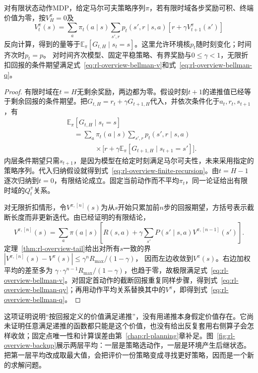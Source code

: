 \begin{theorem}[回报期望与递推一致]
  \label{thm:rl-overview-recursion}
  对有限状态动作MDP，给定马尔可夫策略序列$\pi$，若有限时域各步奖励可积、终端价值为零，按$V_H^\pi=0$及
  \begin{equation}
    V_t^\pi(s)=\sum_a\pi_t(a\mid s)\sum_{s',r}
      p_t(s',r\mid s,a)[r+\gamma V_{t+1}^\pi(s')]
    \label{eq:rl-overview-finite-recursion}
  \end{equation}
  反向计算，得到的量等于$\mathbb E_\pi[G_{t,H}\mid s_t=s]$。这里允许环境核$p_t$随时刻变化；时间齐次时$p_t=p$。
  对时间齐次模型、固定平稳策略、有界奖励与$0\leq\gamma<1$，无限折扣回报的条件期望满足式~\eqref{eq:rl-overview-bellman-v}和式~\eqref{eq:rl-overview-bellman-q}。
\end{theorem}

\begin{proof}
  有限时域在$t=H$无剩余奖励，两边都为零。假设时刻$t+1$的递推值已经等于剩余回报的条件期望。把$G_{t,H}=r_t+\gamma G_{t+1,H}$代入，并依次条件化于$a_t,r_t,s_{t+1}$，有
  \[
  \begin{aligned}
   &\mathbb E_\pi[G_{t,H}\mid s_t=s]\\
   &\quad=\sum_a\pi_t(a\mid s)\sum_{s',r}p_t(s',r\mid s,a)\\
   &\qquad\qquad{}\times
      \bigl[r+\gamma\mathbb E_\pi[G_{t+1,H}\mid s_{t+1}=s']\bigr].
  \end{aligned}
  \]
  内层条件期望只需$s_{t+1}$，是因为模型在给定时刻满足马尔可夫性，未来采用指定的策略序列。代入归纳假设就得到式~\eqref{eq:rl-overview-finite-recursion}。由$t=H-1$逐次归纳到$t=0$，有限结论成立。固定当前动作而不平均$\pi_t$，同一论证给出有限时域的$Q_t^\pi$关系。

  对无限折扣情形，令$V^{\pi,[n]}(s)$为从$s$开始只累加前$n$步的回报期望，方括号表示截断长度而非更新迭代。由已经证明的有限结论，
  \[
    V^{\pi,[n]}(s)=\sum_a\pi(a\mid s)
       \left[R(s,a)+\gamma\sum_{s'}P(s'\mid s,a)
                                       V^{\pi,[n-1]}(s')\right].
  \]
  定理~\ref{thm:rl-overview-tail}给出对所有$s$一致的界
  $|V^{\pi,[n]}(s)-V^\pi(s)|\leq\gamma^nR_{\max}/(1-\gamma)$，
  因而左边收敛到$V^\pi(s)$。右边加权平均的差至多为
  $\gamma\cdot\gamma^{n-1}R_{\max}/(1-\gamma)$，也趋于零，故极限满足式~\eqref{eq:rl-overview-bellman-v}。对固定首动作的截断回报重复同样步骤，得到式~\eqref{eq:rl-overview-bellman-qv}；再用动作平均关系替换其中的$V^\pi$，即得到式~\eqref{eq:rl-overview-bellman-q}。
\end{proof}

这项证明说明“按回报定义的价值满足递推”，没有用递推本身假定价值存在。它尚未证明任意满足递推的函数都只能是这个价值，也没有给出反复套用右侧算子会怎样收敛；固定点唯一性和计算误差由第~\ref{chap:rl-planning}章补足。图~\ref{fig:rl-overview-backup}展示两层平均：一层是策略选动作，一层是环境产生后继状态。把第一层平均改成取最大值，会把评价一份策略变成寻找更好策略，因而是一个新的求解问题。

